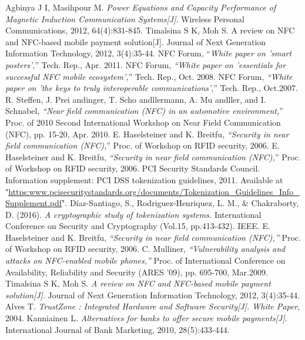 \documentclass[journal]{IEEEtran}
\begin{document}
\begin{thebibliography}{1}
Agbinya J I, Masihpour M. \emph{Power Equations and Capacity Performance of Magnetic Induction Communication Systems[J]}. Wireless Personal Communications, 2012, 64(4):831-845.
Timalsina S K, Moh S. A review on NFC and NFC-based mobile payment solution[J]. Journal of Next Generation Information Technology, 2012, 3(4):35-44.
NFC Forum, “\emph{White paper on ’smart posters’},” Tech. Rep., Apr. 2011.
NFC Forum, \emph{“White paper on ’essentials for successful NFC mobile ecosystem’,}” Tech. Rep., Oct.
2008.
NFC Forum, \emph{“White paper on ’the keys to truly interoperable communications’},” Tech. Rep., Oct.2007.
R. Steffen, J. Prei andinger, T. Scho andllermann, A. Mu andller, and I. Schnabel, \emph{“Near field communication (NFC) in an automotive environment,}” Proc. of 2010 Second International Workshop on Near Field Communication (NFC), pp. 15-20, Apr. 2010.
E. Haselsteiner and K. Breitfu, \emph{“Security in near field communication (NFC),}” Proc. of Workshop on RFID security, 2006.
E. Haselsteiner and K. Breitfu, \emph{“Security in near field communication (NFC),}” Proc. of Workshop
on RFID security, 2006.
PCI Security Standards Council. Information supplement: PCI DSS tokenization guidelines, 2011. Available at "\url{https:www.pcisecuritystandards.org/documents/Tokenization_Guidelines_Info_Supplement.pdf}".
Díaz-Santiago, S., Rodriguez-Henriquez, L. M., \& Chakraborty, D. (2016). \emph{A cryptographic study of tokenization systems.} International Conference on Security and Cryptography (Vol.15, pp.413-432). IEEE.
E. Haselsteiner and K. Breitfu, \emph{“Security in near field communication (NFC),”} Proc. of Workshop on RFID security, 2006.
C. Mulliner, \emph{“Vulnerability analysis and attacks on NFC-enabled mobile phones,”} Proc. of International Conference on Availability, Reliability and Security (ARES ’09), pp. 695-700, Mar.2009.
Timalsina S K, Moh S. \emph{A review on NFC and NFC-based mobile payment solution[J]}. Journal of Next Generation Information Technology, 2012, 3(4):35-44.
Alves T. \emph{TrustZone : Integrated Hardware and Software Security[J]. White Paper}, 2004.
Kanniainen L. \emph{Alternatives for banks to offer secure mobile payments[J]}. International Journal of Bank Marketing, 2010, 28(5):433-444.

\end{thebibliography}
\end{document}
